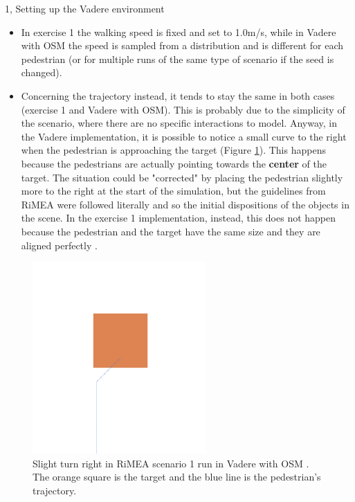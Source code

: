 \documentclass[10pt,a4paper]{article}
\begin{document}
\begin{task}{1, Setting up the Vadere environment}
\begin{itemize}
    \item In exercise 1 the walking speed is fixed and set to 1.0m/s, while in Vadere with OSM the speed is sampled from a distribution and is different for each pedestrian (or for multiple runs of the same type of scenario if the seed is changed).
    
    \item Concerning the trajectory instead, it tends to stay the same in both cases (exercise 1 and Vadere with OSM).
    This is probably due to the simplicity of the scenario, where there are no specific interactions to model.
    Anyway, in the Vadere implementation, it is possible to notice a small curve to the right when the pedestrian is approaching the target (Figure \ref{fig:rimea1-turn-right}).
    This happens because the pedestrians are actually pointing towards the \textbf{center} of the target.
    The situation could be "corrected" by placing the pedestrian slightly more to the right at the start of the simulation, but the guidelines from RiMEA were followed literally and so the initial dispositions of the objects in the scene.
    In the exercise 1 implementation, instead, this does not happen because the pedestrian and the target have the same size and they are aligned perfectly .
\end{itemize}

\begin{figure}[H]
    \centering
    \includegraphics[scale=0.5]{images/turn-right-rimea1.png}
    \caption{Slight turn right in RiMEA scenario 1 run in Vadere with OSM \cite{osm, bridging-the-gap, dynamic-stride-length}.
    The orange square is the target and the blue line is the pedestrian's trajectory.}
    \label{fig:rimea1-turn-right}
\end{figure}


\end{task}
\end{document}
